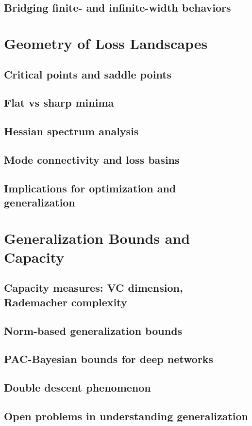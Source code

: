 \subsection{Bridging finite- and infinite-width behaviors}

\section{Geometry of Loss Landscapes}
\subsection{Critical points and saddle points}
\subsection{Flat vs sharp minima}
\subsection{Hessian spectrum analysis}
\subsection{Mode connectivity and loss basins}
\subsection{Implications for optimization and generalization}

\section{Generalization Bounds and Capacity}
\subsection{Capacity measures: VC dimension, Rademacher complexity}
\subsection{Norm-based generalization bounds}
\subsection{PAC-Bayesian bounds for deep networks}
\subsection{Double descent phenomenon}
\subsection{Open problems in understanding generalization}

